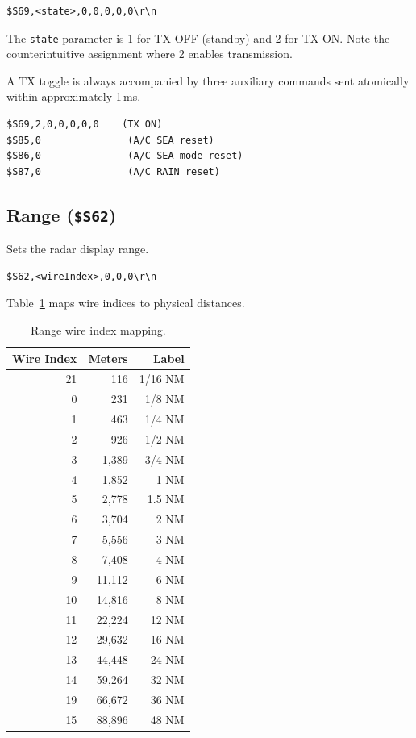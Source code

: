 \documentclass[11pt,letterpaper]{article}
\begin{document}
\begin{lstlisting}
$S69,<state>,0,0,0,0,0\r\n
\end{lstlisting}

The \texttt{state} parameter is 1 for TX OFF (standby) and 2 for TX ON. Note the counterintuitive assignment where 2 enables transmission.

A TX toggle is always accompanied by three auxiliary commands sent atomically within approximately 1\,ms.

\begin{lstlisting}
$S69,2,0,0,0,0,0    (TX ON)
$S85,0               (A/C SEA reset)
$S86,0               (A/C SEA mode reset)
$S87,0               (A/C RAIN reset)
\end{lstlisting}


\subsection{Range (\texttt{\$S62})}

Sets the radar display range.

\begin{lstlisting}
$S62,<wireIndex>,0,0,0\r\n
\end{lstlisting}

Table~\ref{tab:ranges} maps wire indices to physical distances.

\begin{table}[h]
\centering
\caption{Range wire index mapping.}
\label{tab:ranges}
\begin{tabular}{@{}rrr@{}}
\toprule
\textbf{Wire Index} & \textbf{Meters} & \textbf{Label} \\
\midrule
21 & 116 & 1/16 NM \\
0 & 231 & 1/8 NM \\
1 & 463 & 1/4 NM \\
2 & 926 & 1/2 NM \\
3 & 1{,}389 & 3/4 NM \\
4 & 1{,}852 & 1 NM \\
5 & 2{,}778 & 1.5 NM \\
6 & 3{,}704 & 2 NM \\
7 & 5{,}556 & 3 NM \\
8 & 7{,}408 & 4 NM \\
9 & 11{,}112 & 6 NM \\
10 & 14{,}816 & 8 NM \\
11 & 22{,}224 & 12 NM \\
12 & 29{,}632 & 16 NM \\
13 & 44{,}448 & 24 NM \\
14 & 59{,}264 & 32 NM \\
19 & 66{,}672 & 36 NM \\
15 & 88{,}896 & 48 NM \\
\bottomrule
\end{tabular}
\end{table}
\end{document}
